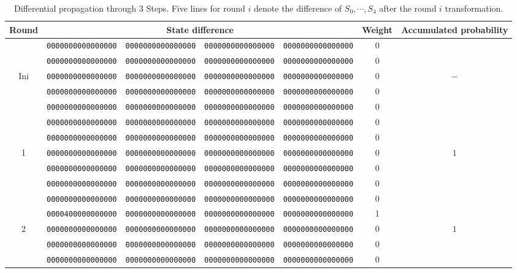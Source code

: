 \begin{table}[!tb]
\begin{center}
\caption{Differential propagation through 3 Steps. Five lines for round $i$ denote the difference of $S_0, \cdots, S_4$ after the round $i$ transformation.} %
\label{Tbl:fin_diff}
{%
\iflncsmargins
\tiny
\else
\scriptsize
\renewcommand{\arraystretch}{0.9}
\fi
\begin{tabular}{ccccccc} \hline
Round & \multicolumn{4}{c}{State difference} & Weight & Accumulated probability \\ \hline
      & {\tt 0000000000000000} & {\tt 0000000000000000} & {\tt 0000000000000000} & {\tt 0000000000000000} & 0  & \\
      & {\tt 0000000000000000} & {\tt 0000000000000000} & {\tt 0000000000000000} & {\tt 0000000000000000} & 0  & \\
Ini   & {\tt 0000000000000000} & {\tt 0000000000000000} & {\tt 0000000000000000} & {\tt 0000000000000000} & 0  & $-$ \\
      & {\tt 0000000000000000} & {\tt 0000000000000000} & {\tt 0000000000000000} & {\tt 0000000000000000} & 0  & \\
      & {\tt 0000000000000000} & {\tt 0000000000000000} & {\tt 0000000000000000} & {\tt 0000000000000000} & 0  & \\ \hline

      & {\tt 0000000000000000} & {\tt 0000000000000000} & {\tt 0000000000000000} & {\tt 0000000000000000} & 0  & \\
      & {\tt 0000000000000000} & {\tt 0000000000000000} & {\tt 0000000000000000} & {\tt 0000000000000000} & 0  & \\
1     & {\tt 0000000000000000} & {\tt 0000000000000000} & {\tt 0000000000000000} & {\tt 0000000000000000} & 0  & $1$\\
      & {\tt 0000000000000000} & {\tt 0000000000000000} & {\tt 0000000000000000} & {\tt 0000000000000000} & 0  & \\
      & {\tt 0000000000000000} & {\tt 0000000000000000} & {\tt 0000000000000000} & {\tt 0000000000000000} & 0  & \\ \hline

      & {\tt 0000000000000000} & {\tt 0000000000000000} & {\tt 0000000000000000} & {\tt 0000000000000000} & 0  & \\
      & {\tt 0000400000000000} & {\tt 0000000000000000} & {\tt 0000000000000000} & {\tt 0000000000000000} & 1  & \\
2     & {\tt 0000000000000000} & {\tt 0000000000000000} & {\tt 0000000000000000} & {\tt 0000000000000000} & 0  & $1$\\
      & {\tt 0000000000000000} & {\tt 0000000000000000} & {\tt 0000000000000000} & {\tt 0000000000000000} & 0  & \\
      & {\tt 0000000000000000} & {\tt 0000000000000000} & {\tt 0000000000000000} & {\tt 0000000000000000} & 0  & \\ \hline


\end{tabular}}
\end{center}
\end{table}

